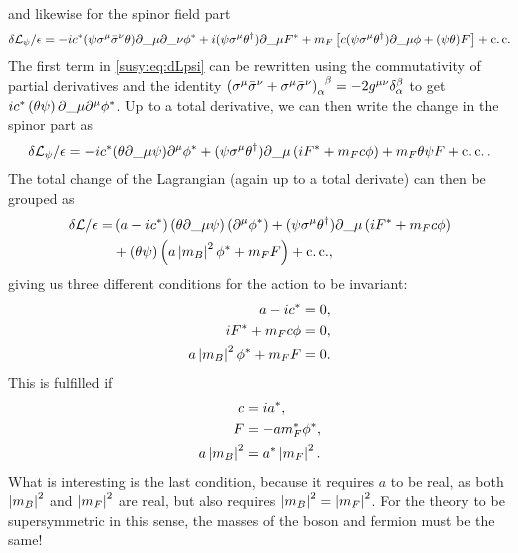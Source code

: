 \documentclass[../main.tex]{subfiles}
\begin{document}
and likewise for the spinor field part
\begin{equation}
    \label{susy:eq:dLpsi}
    \delta\L_\psi/\epsilon = -i c^\ast (\psi \sigma\^{\mu}\bar{\sigma}\^{\nu}\theta) \partial\_{\mu}\partial\_{\nu} \phi^\ast + i (\psi \sigma\^{\mu} \theta^\dagger) \partial\_{\mu} F^\ast + m_F \bclosed{c (\psi\sigma\^{\mu}\theta^\dagger) \partial\_{\mu} \phi + (\psi\theta) F} + \cc
\end{equation}
The first term in \cref{susy:eq:dLpsi} can be rewritten using the commutativity of partial derivatives and the identity \(\tensor{\pclosed{\sigma\^{\mu} \bar{\sigma}\^{\nu} + \sigma\^{\mu} \bar{\sigma}\^{\nu}}}{_\alpha^\beta} = -2\tensor{g}{^\mu^\nu} \tensor*{\delta}{_\alpha^\beta}\) to get \(i c^\ast \pclosed{\theta \psi} \partial\_{\mu}\partial\^{\mu} \phi^\ast\).
Up to a total derivative, we can then write the change in the spinor part as
\begin{equation}
    \delta\L_\psi/\epsilon = -i c^\ast (\theta\partial\_{\mu}\psi)\partial\^{\mu} \phi^\ast + (\psi \sigma\^{\mu} \theta^\dagger) \partial\_{\mu} \pclosed{i F^\ast + m_F c \phi} + m_F \theta\psi F + \cc.
\end{equation}
The total change of the Lagrangian (again up to a total derivate) can then be grouped as
\begin{align}
    \nonumber
    \delta\L/\epsilon = & \pclosed{a-ic^\ast} (\theta\partial\_{\mu}\psi) \pclosed{\partial\^{\mu} \phi^\ast}
    + (\psi \sigma\^{\mu} \theta^\dagger) \partial\_{\mu} \pclosed{i F^\ast + m_F c \phi}                     \\
                        & + (\theta\psi) \pclosed{a\abs{m_B}^2\phi^\ast + m_F F} + \cc,
\end{align}
giving us three different conditions for the action to be invariant:
\begin{subequations}
    \begin{align}
        a - ic^\ast                    & = 0, \\
        i F^\ast + m_F c \phi          & = 0, \\
        a\left|m_B\right|^2 \phi^\ast + m_F F & = 0.
    \end{align}
\end{subequations}
This is fulfilled if
\begin{subequations}
    \begin{align}
        c            & = i a^\ast,              \\
        F            & = -a m_F^\ast \phi^\ast, \\
        a\left|m_B\right|^2 & = a^\ast \left|m_F\right|^2.
    \end{align}
\end{subequations}
What is interesting is the last condition, because it requires \(a\) to be real, as both \(\left|m_B\right|^2\) and \(\left|m_F\right|^2\) are real, but also requires \(\left|m_B\right|^2 = \left|m_F\right|^2\).
For the theory to be supersymmetric in this sense, the masses of the boson and fermion must be the same!
\end{document}
